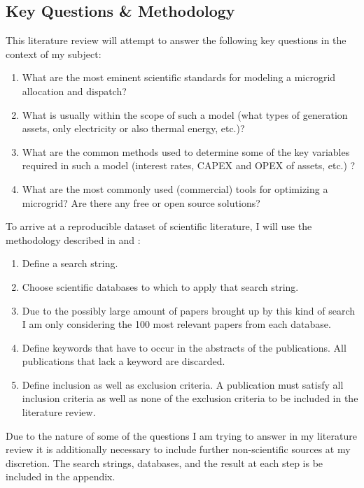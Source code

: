 \documentclass[
	11pt,								%
	DIV10,								%
	a4paper,         					%
	oneside,							%
	headheight=20pt,					%
	footheight=20pt,					%
    parskip=full,						%
    listof=totoc,						%
	bibliography=totoc,					%
	index=totoc,						%
]{scrartcl}
\begin{document}
\subsection{Key Questions \& Methodology}
This literature review will attempt to answer the following key questions in the context of my subject:
\begin{enumerate}
	\item What are the most eminent scientific standards for modeling a microgrid allocation and dispatch?
	\item What is usually within the scope of such a model (what types of generation assets, only electricity or also thermal energy, etc.)? 
	\item What are the common methods used to determine some of the key variables required in such a model (interest rates, CAPEX and OPEX of assets, etc.) ?
	\item What are the most commonly used (commercial) tools for optimizing a microgrid? Are there any free or open source solutions? 
\end{enumerate} 

To arrive at a reproducible dataset of scientific literature, I will use the methodology described in \cite{petersenSystematicMappingStudies2008} and \cite{pop00975}:

\begin{enumerate}
	\item Define a search string.
	\item Choose scientific databases to which to apply that search string.
	\item Due to the possibly large amount of papers brought up by this kind of search I am only considering the 100 most relevant papers from each database.
	\item Define keywords that have to occur in the abstracts of the publications. All publications that lack a keyword are discarded.
	\item Define inclusion as well as exclusion criteria. A publication must satisfy all inclusion criteria as well as none of the exclusion criteria to be included in the literature review.
\end{enumerate}
Due to the nature of some of the questions I am trying to answer in my literature review it is additionally necessary to include further non-scientific sources at my discretion.
The search strings, databases, and the result at each step is be included in the appendix.
\end{document}
